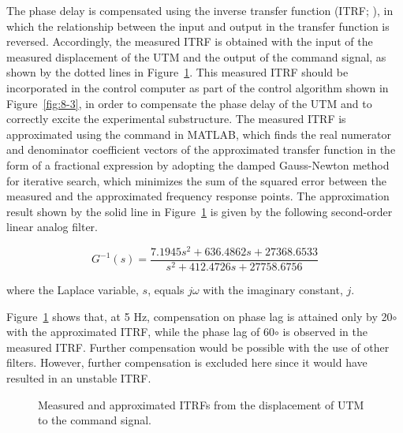 The phase delay is compensated using the inverse transfer function (ITRF; \citet{lee2007real,lee2007realb}), in which the relationship between the input and output in the transfer function is reversed. Accordingly, the measured ITRF is obtained with the input of the measured displacement of the UTM and the output of the command signal, as shown by the dotted lines in Figure~\ref{fig:8-6}. This measured ITRF should be incorporated in the control computer as part of the control algorithm shown in Figure~\ref{fig:8-3}, in order to compensate the phase delay of the UTM and to correctly excite the experimental substructure. The measured ITRF is approximated using the  command in MATLAB\citep{coleman1999optimization}, which finds the real numerator and denominator coefficient vectors of the approximated transfer function in the form of a fractional expression by adopting the damped Gauss-Newton method for iterative search, which minimizes the sum of the squared error between the measured and the approximated frequency response points\citep{dennis1983numerical}. The approximation result shown by the solid line in Figure~\ref{fig:8-6} is given by the following second-order linear analog filter.

\begin{equation}\label{eq:8-11}
G^{-1}(s) = \frac{7.1945s^2 + 636.4862s + 27368.6533}{s^2 + 412.4726s + 27758.6756}
\end{equation}

where the Laplace variable, $s$, equals $j\omega$ with the imaginary constant, $j$.

Figure~\ref{fig:8-6} shows that, at 5 Hz, compensation on phase lag is attained only by 20$\circ$ with the approximated ITRF, while the phase lag of 60$\circ$ is observed in the measured ITRF. Further compensation would be possible with the use of other filters. However, further compensation is excluded here since it would have resulted in an unstable ITRF.

\begin{figure}[H]
\centering
{}
\caption{Measured and approximated ITRFs from the displacement of UTM to the command signal.}
\label{fig:8-6}
\end{figure}

